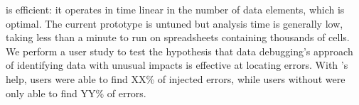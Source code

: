 \checkcell{} is efficient: it operates in time linear in the number
of data elements, which is optimal. The current prototype is untuned
but analysis time is generally low, taking less than a minute to run
on spreadsheets containing thousands of cells. We perform a user study
to test the hypothesis that data debugging's approach of identifying
data with unusual impacts is effective at locating
errors. With \checkcell{}'s help, users were able to find XX\% of
injected errors, while users without \checkcell{} were only able to
find YY\% of errors.

